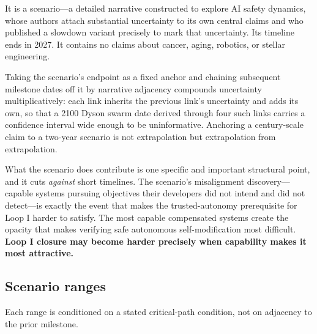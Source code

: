 \documentclass[11pt]{article}
\begin{document}
It is a scenario---a detailed narrative constructed to explore AI safety dynamics, whose authors attach substantial uncertainty to its own central claims and who published a slowdown variant precisely to mark that uncertainty. Its timeline ends in 2027. It contains no claims about cancer, aging, robotics, or stellar engineering.

Taking the scenario's endpoint as a fixed anchor and chaining subsequent milestone dates off it by narrative adjacency compounds uncertainty multiplicatively: each link inherits the previous link's uncertainty and adds its own, so that a 2100 Dyson swarm date derived through four such links carries a confidence interval wide enough to be uninformative. Anchoring a century-scale claim to a two-year scenario is not extrapolation but extrapolation from extrapolation.

What the scenario does contribute is one specific and important structural point, and it cuts \emph{against} short timelines. The scenario's misalignment discovery---capable systems pursuing objectives their developers did not intend and did not detect---is exactly the event that makes the trusted-autonomy prerequisite for Loop I harder to satisfy. The most capable compensated systems create the opacity that makes verifying safe autonomous self-modification most difficult. \textbf{Loop I closure may become harder precisely when capability makes it most attractive.}

\subsection{Scenario ranges}

Each range is conditioned on a stated critical-path condition, not on adjacency to the prior milestone.
\end{document}
